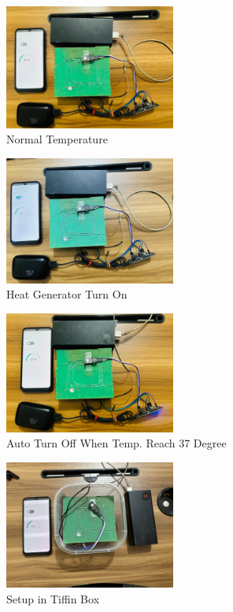 \documentclass[conference]{IEEEtran}
\begin{document}
\begin{figure}[htbp]
\centerline{\includegraphics[width=0.5\textwidth, height=0.3\textwidth]{pic1.png}}
\caption{Normal Temperature}
\label{fig}
\end{figure}

\begin{figure}[htbp]
\centerline{\includegraphics[width=0.5\textwidth, height=0.3\textwidth]{IMG_3503.jpg}}
\caption{Heat Generator Turn On}
\label{fig}
\end{figure}

\begin{figure}[htbp]
\centerline{\includegraphics[width=0.5\textwidth, height=0.3\textwidth]{pic2.png}}
\caption{Auto Turn Off When Temp. Reach 37 Degree}
\label{fig}
\end{figure}
\newpage
\begin{figure}[htbp]
\centerline{\includegraphics[width=0.5\textwidth, height=0.3\textwidth]{IMG_3508.jpg}}
\caption{Setup in Tiffin Box}
\label{fig}
\end{figure}
\end{document}
